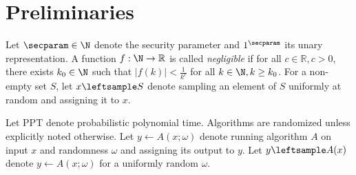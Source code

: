 
\newcommand{\com}{\mathsf{Com}}
\newcommand{\open}{\mathsf{Open}}
\newcommand{\commit}{\mathsf{Commit}}
\newcommand{\NARK}{\mathsf{NARK}}
\section{Preliminaries} %
\label{sec:background}

Let $\secparam \in \N$ denote the security parameter and $1^{\secparam}$ its unary
representation.
A function $f : \N \rightarrow \mathbb{R}$ is called \emph{negligible} if for all $c
\in \mathbb{R}, c > 0$, there exists $k_0 \in \N$
such that
$\lvert f(k) \rvert < \frac{1}{k^c}$ for all $k \in \N, k \geq k_0$.
For a non-empty set $S$, let $x\leftsample S$ denote sampling
an element of $S$ uniformly at random and assigning it to $x$.

Let PPT denote probabilistic polynomial time.  Algorithms are randomized unless explicitly noted otherwise.
Let $y \gets A(x;\omega)$ denote running algorithm $A$ on
input $x$ and randomness $\omega$ and assigning its output to $y$.
Let $y \leftsample A(x)$
denote $y \gets A(x;\omega)$ for a uniformly random $\omega$.

